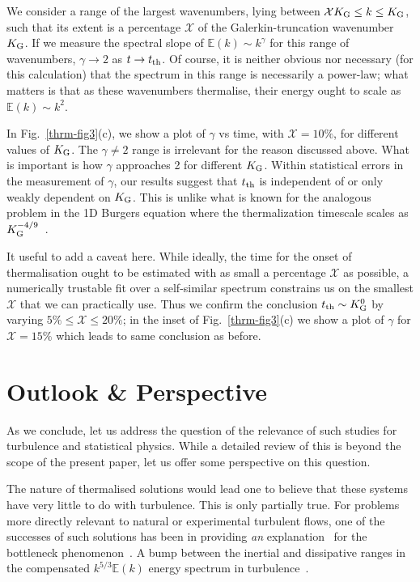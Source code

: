\documentclass[../Rajarshi-thesis-draft.tex]{subfiles}
\begin{document}
{We consider a range of the largest wavenumbers, lying between $\mathcal{X} K_{\rm G} \le k \le K_{\rm G}$,
such that its extent is a percentage $\mathcal{X}$ of the Galerkin-truncation
wavenumber $K_{\rm G}$. If we measure the spectral slope of $\mathbb{E}(k) \sim k^\gamma$ for this range of wavenumbers, $\gamma \to 2$ as
$t \to t_{\rm th}$. Of course, it is neither obvious nor necessary (for this calculation) that the spectrum in this range is
necessarily a power-law; what matters is that as these wavenumbers thermalise, their energy ought to scale as $\mathbb{E}(k) \sim k^2$.}

In Fig.~\ref{thrm-fig3}(c), we show a plot of $\gamma$ vs time, with
$\mathcal{X} = 10\%$, for different values of $K_{\rm G}$. The $\gamma \neq 2$
range is irrelevant for the reason discussed above. What is important is how
$\gamma$ approaches 2 for different $K_{\rm G}$. Within statistical errors in the
measurement of $\gamma$, our results suggest that $t_{\rm th}$ is independent
of or only weakly dependent on $K_{\rm G}$. %
{This is unlike what is known for the analogous  problem in the 1D Burgers equation where the thermalization timescale scales as $K_{\rm G}^{-4/9}$~\cite{VenkataramanRay}}.

It useful to add a caveat here. While ideally, the time for the onset of
thermalisation ought to be estimated with as small a percentage $\mathcal{X}$
as possible, a numerically trustable fit over a self-similar spectrum
constrains us on the smallest  $\mathcal{X}$ that we can practically use.
Thus we confirm the conclusion $t_{\rm th} \sim K_{\rm G}^0$ by varying
$5\% \le \mathcal{X} \le 20\%$; in the inset of Fig.~\ref{thrm-fig3}(c) we
show a plot of $\gamma$ for $\mathcal{X} =  15\%$ which leads to same conclusion as before.

\section{Outlook \& Perspective}

As we conclude, let us address the question of the relevance of such studies
for turbulence and statistical physics. While a detailed review of this
is beyond the scope of the present paper, let us offer some perspective
on this question.

The nature of thermalised solutions would lead one to believe that these
systems have very little to do with turbulence. This is only partially true.
For problems more directly relevant to natural or experimental turbulent flows,
one of the successes of such solutions has been in providing
\textit{an} explanation~\cite{FrischetalBottleneck2008,FrischetalBottleneck2013}
for the bottleneck phenomenon~\cite{Falkovich1994,Lohse1995}. A bump between the
inertial and dissipative ranges in the compensated $k^{5/3} \mathbb{E}(k)$ energy
spectrum in turbulence~\cite{Pak1991,SheJackson1993,Gotohetal2002,Kurien2004,Verma2007,Mininni2008,Ishihara2009,Donzis2010}.
\end{document}
